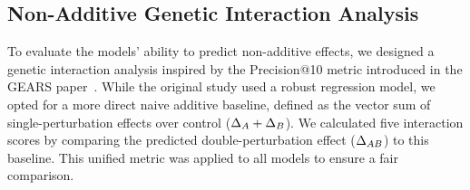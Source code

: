 \subsection{Non-Additive Genetic Interaction Analysis}
\label{app:metrics:genetic_interaction}

To evaluate the models' ability to predict non-additive effects, we designed a genetic interaction analysis inspired by the Precision@10 metric introduced in the GEARS paper~\citep{roohani2024predicting}.
While the original study used a robust regression model, we opted for a more direct naive additive baseline, defined as the vector sum of single-perturbation effects over control ($\Delta_A + \Delta_B$).
We calculated five interaction scores by comparing the predicted double-perturbation effect ($\Delta_{AB}$) to this baseline.
This unified metric was applied to all models to ensure a fair comparison.

